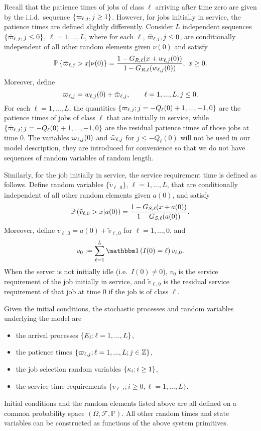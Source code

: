 \documentclass{article}
\numberwithin{equation}{section}
\begin{document}
Recall that the patience times of jobs of class $\ell$ arriving after time zero are given by the i.i.d.\ sequence $\{\varpi_{\ell,j}, j\geq1\}$. However, for jobs initially in service, the patience times are defined slightly differently. Consider $L$ independent sequences $\{\tilde{\varpi}_{\ell,j},j\leq 0\}$, $\ell=1,...,L$, where for each $\ell$, $\tilde{\varpi}_{\ell,j},j\leq0$, are conditionally independent of all other random elements given $\nu(0)$ and satisfy
\[
\mathbb{P}\left\{\tilde{\varpi}_{\ell,j}>x|\nu(0)\right\}=\frac{1- G_{R,\ell}(x+w_{\ell,j}(0))}{1- G_{R,\ell}(w_{\ell,j}(0))}, \ x\geq 0.
\]
Moreover, define 
\begin{equation}\label{def_initial_age}
\varpi_{\ell,j}=w_{\ell,j}(0)+\tilde{\varpi}_{\ell,j},\quad\quad \ell=1,...,L,j\leq 0.
\end{equation}
For each $\ell=1,...,L$, the quantities $\{\varpi_{\ell,j};j=-Q_\ell(0)+1,...,-1,0\}$ are the patience times of jobs of class $\ell$ that are initially in service, while $\{\tilde{\varpi}_{\ell,j};j=-Q_\ell(0)+1,...,-1,0\}$ are the residual patience times of those jobs at time $0$. The variables $\varpi_{\ell,j}(0)$ and $\tilde {\varpi}_{\ell,j}$ for $j\leq -Q_\ell(0)$ will not be used in our model description, they are introduced for convenience so that we do not have sequences of random variables of random length.

Similarly, for the job initially in service, the  service requirement time is defined as follows. Define random variables $\{\tilde v_{\ell,0}\}$, $\ell=1,...,L$, that are conditionally independent of all other random elements given $a(0)$, and satisfy
\[
\mathbb{P}\left(\tilde v_{\ell,0}>x|a(0)\right) = \frac{1- G_{S,\ell}(x+a(0))}{1- G_{S,\ell}(a(0))}.
\]
Moreover, define $v_{\ell,0}= a(0)+\tilde v_{\ell,0}$ for $\ell=1,...,0$, and
\begin{equation}\label{def_initial_service}
v_0 := \sum_{\ell=1}^L \indic{I(0)=\ell} v_{\ell,0}.
\end{equation}
When the server is not initially idle (i.e.\ $I(0)\neq 0$), $v_0$ is the  service requirement of the job initially in service, and $\tilde v_{\ell,0}$ is the residual service requirement of that job at time $0$ if the job is of class $\ell$.

\begin{remark}
Given the initial conditions, the stochastic processes and random variables underlying the model are
\begin{itemize}
\item the arrival processes $\{E_\ell;\ell=1,...,L\}$, 
\item the patience times $\{\varpi_{\ell,j};\ell=1,...,L;j\in\mathbb{Z}\}$,
\item the job selection random variables $\{\kappa_i;i\geq 1\}$, 
\item the service time requirements $\{v_{\ell,i};i\geq 0,\ell=1,...,L\}.$ 
\end{itemize}
Initial conditions and the random elements listed above are all defined on a common probability space $(\Omega,\mathcal{F},\mathbb{P})$. All other random times and state variables can be constructed as functions of the above system primitives.
\end{remark}
\end{document}

